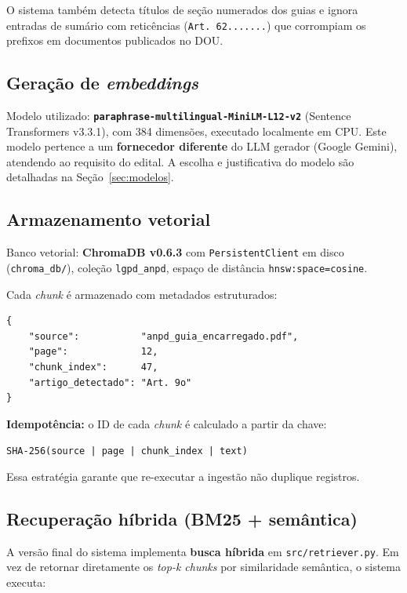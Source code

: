 \documentclass[
  12pt,
  a4paper,
  brazil,
  article,
  oneside,
  sumario=tradicional
]{abntex2}
\begin{document}
O sistema também detecta títulos de seção numerados dos guias e ignora entradas de
sumário com reticências (\texttt{Art. 62.......}) que corrompiam os prefixos em
documentos publicados no DOU.

\subsection{Geração de \textit{embeddings}}

Modelo utilizado: \textbf{\texttt{paraphrase-multilingual-MiniLM-L12-v2}} (Sentence
Transformers v3.3.1), com 384 dimensões, executado localmente em CPU. Este modelo
pertence a um \textbf{fornecedor diferente} do LLM gerador (Google Gemini),
atendendo ao requisito do edital. A escolha e justificativa do modelo são
detalhadas na Seção~\ref{sec:modelos}.

\subsection{Armazenamento vetorial}

Banco vetorial: \textbf{ChromaDB v0.6.3} com \texttt{PersistentClient} em disco
(\texttt{chroma\_db/}), coleção \texttt{lgpd\_anpd}, espaço de distância
\texttt{hnsw:space=cosine}.

Cada \textit{chunk} é armazenado com metadados estruturados:

\begin{lstlisting}[style=json,
  caption={Metadados armazenados por \textit{chunk} no ChromaDB},
  label=lst:meta]
{
    "source":           "anpd_guia_encarregado.pdf",
    "page":             12,
    "chunk_index":      47,
    "artigo_detectado": "Art. 9o"
}
\end{lstlisting}

\textbf{Idempotência:} o ID de cada \textit{chunk} é calculado a partir da chave:

\begin{center}
\texttt{SHA-256(source | page | chunk\_index | text)}
\end{center}

Essa estratégia garante que re-executar a ingestão não duplique registros.

\subsection{Recuperação híbrida (BM25 + semântica)}

A versão final do sistema implementa \textbf{busca híbrida} em
\texttt{src/retriever.py}. Em vez de retornar diretamente os \textit{top-k chunks}
por similaridade semântica, o sistema executa:
\end{document}

